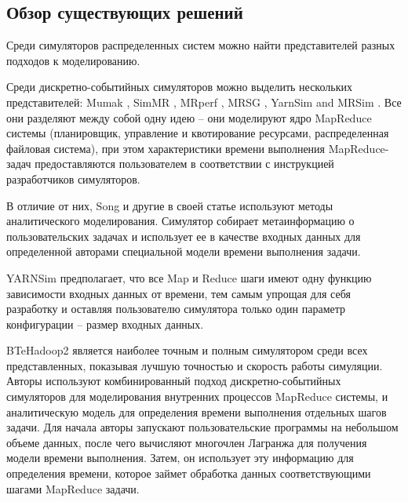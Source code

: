 \documentclass[../diploma.tex]{subfile}
\begin{document}
    
    \subsection{Обзор существующих решений}\label{sec:review:subsec:existing}

    Среди симуляторов распределенных систем можно найти представителей разных
    подходов к моделированию. 

    Среди дискретно-событийных симуляторов можно выделить нескольких
    представителей: Mumak \cite{mumak}, SimMR \cite{simmr}, MRperf
    \cite{mrperf}, MRSG \cite{mrsg}, YarnSim \cite{yarnsim} and MRSim
    \cite{mrsim}. Все они разделяют между собой одну идею -- они моделируют ядро
    MapReduce системы (планировщик, управление и квотирование ресурсами,
    распределенная файловая система), при этом характеристики времени выполнения
    MapReduce-задач предоставляются пользователем в соответствии с инструкцией
    разработчиков симуляторов. 

    В отличие от них, Song и другие в своей статье \cite{song} используют методы
    аналитического моделирования. Симулятор собирает метаинформацию о
    пользовательских задачах и использует ее в качестве входных данных для
    определенной авторами специальной модели времени выполнения задачи. 
    
    YARNSim предполагает, что все Map и Reduce шаги имеют одну функцию
    зависимости входных данных от времени, тем самым упрощая для себя разработку
    и оставляя пользователю симулятора только один параметр конфигурации --
    размер входных данных. 

    BTeHadoop2 \cite{baseline_model} является наиболее точным и полным
    симулятором среди всех представленных, показывая лучшую точностью и скорость
    работы симуляции. Авторы используют комбинированный подход
    дискретно-событийных симуляторов для моделирования внутренних процессов
    MapReduce системы, и аналитическую модель для определения времени выполнения
    отдельных шагов задачи. Для начала авторы запускают пользовательские
    программы на небольшом объеме данных, после чего вычисляют многочлен
    Лагранжа для получения модели времени выполнения. Затем, он использует эту
    информацию для определения времени, которое займет обработка данных
    соответствующими шагами MapReduce задачи.
\end{document}
